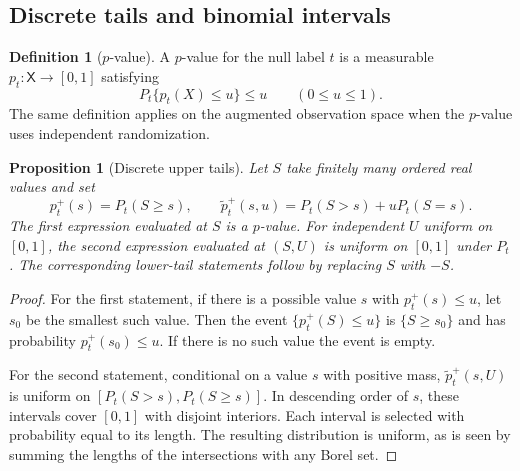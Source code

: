 \documentclass[11pt,oneside]{book}
\newtheorem{proposition}[theorem]{Proposition}
\theoremstyle{definition}
\newtheorem{definition}[theorem]{Definition}
\theoremstyle{remark}
\begin{document}
\subsection{Discrete tails and binomial intervals}
\label{subsec:confidence-discrete}

\begin{definition}[$p$-value]
\label{def:test-p-value}
A $p$-value for the null label $t$ is a measurable
$p_t:\mathsf X\to[0,1]$ satisfying
\[
P_t\{p_t(X)\leq u\}\leq u\qquad(0\leq u\leq1).
\]
The same definition applies on the augmented observation space
when the $p$-value uses independent randomization.
\end{definition}

\begin{proposition}[Discrete upper tails]
\label{prop:discrete-tail-pvalues}
Let $S$ take finitely many ordered real values and set
\[
p_t^+(s)=P_t(S\geq s),\qquad
\widetilde p_t^+(s,u)=P_t(S>s)+uP_t(S=s).
\]
The first expression evaluated at $S$ is a $p$-value.
For independent $U$ uniform on $[0,1]$, the second expression
evaluated at $(S,U)$ is uniform on $[0,1]$ under $P_t$.
The corresponding lower-tail statements follow by replacing
$S$ with $-S$.
\end{proposition}
\begin{proof}
For the first statement, if there is a possible value $s$ with
$p_t^+(s)\leq u$, let $s_0$ be the smallest such value.
Then the event $\{p_t^+(S)\leq u\}$ is $\{S\geq s_0\}$ and has
probability $p_t^+(s_0)\leq u$. If there is no such value the
event is empty.

For the second statement, conditional on a value $s$ with
positive mass, $\widetilde p_t^+(s,U)$ is uniform on
$[P_t(S>s),P_t(S\geq s)]$. In descending order of $s$, these
intervals cover $[0,1]$ with disjoint interiors. Each interval
is selected with probability equal to its length. The
resulting distribution is uniform, as is seen by summing
the lengths of the intersections with any Borel set.
\end{proof}
\end{document}
